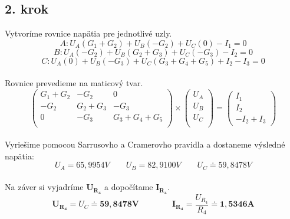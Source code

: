 \subsection*{2. krok}
Vytvoríme rovnice napätia pre jednotlivé uzly.\\
    $$A:U_A(G_1+G_2)+U_B(-G_2)+U_C(0)-I_1=0$$
    $$B:U_A(-G_2)+U_B(G_2+G_3)+U_C(-G_3)-I_2=0$$
    $$C:U_A(0)+U_B(-G_3)+U_C(G_3+G_4+G_5)+I_2-I_3=0$$\\
Rovnice prevedieme na maticový tvar.\\
$$\begin{pmatrix}
    G_1+G_2 & -G_2 & 0\\
    -G_2 & G_2+G_3 & -G_3\\
    0 & -G_3 & G_3+G_4+G_5\\
\end{pmatrix}
\times
\begin{pmatrix}
    U_A\\
    U_B\\
    U_C\\
\end{pmatrix}
=
\begin{pmatrix}
    I_1\\
    I_2\\
    -I_2+I_3
\end{pmatrix}$$\\
Vyriešime pomocou Sarrusovho a Cramerovho pravidla a dostaneme výsledné napätia:\\
$$U_A=65,9954V\qquad U_B=82,9100V\qquad U_C \doteq 59,8478V$$\\
Na záver si vyjadríme $\pmb{U_{R_4}}$ a dopočítame $\pmb{I_{R_4}}$.\\
$$\pmb{U_{R_4}}=U_C \doteq \pmb{59,8478V}\qquad\qquad \pmb{I_{R_4}}=\frac{U_{R_4}}{R_4} \doteq \pmb{1,5346A}$$

    

